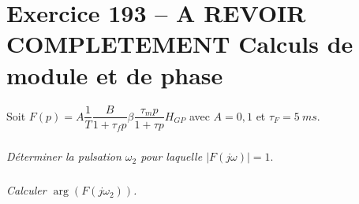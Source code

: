 \section*{Exercice 193 -- A REVOIR COMPLETEMENT Calculs de module et de phase}
\setcounter{exo}{0}


Soit $F(p)=A\dfrac{1}{T}\dfrac{B}{1+\tau_f p}\beta \dfrac{\tau_m p}{1+\tau p} H_{GP}$ avec $A=0,1$ et $\tau_F=\SI{5}{ms}$.


\subparagraph{}
\textit{Déterminer la pulsation $\omega_2$ pour laquelle $\left| F(j\omega) \right|=1.$}

\subparagraph{}
\textit{Calculer $\arg \left(F(j\omega_2)\right)$.}

